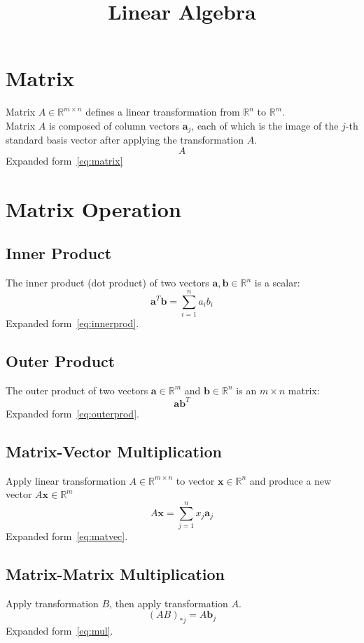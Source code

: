 \documentclass{article}
\title{Linear Algebra}
\date{}
\begin{document}
\maketitle

\tableofcontents

\newpage
\section{Matrix}
Matrix $A \in \mathbb{R}^{m \times n}$ defines a linear transformation from $\mathbb{R}^n$ to $\mathbb{R}^m$.\\
Matrix $A$ is composed of column vectors $\mathbf{a}_j$, each of which is the image of the $j$-th standard basis vector after applying the transformation $A$.
\[
    A
\]
Expanded form~\ref{eq:matrix}


\newpage
\section{Matrix Operation}


\subsection{Inner Product}
The inner product (dot product) of two vectors $\mathbf{a}, \mathbf{b} \in \mathbb{R}^n$ is a scalar:
\[
    \mathbf{a}^T \mathbf{b} = \sum_{i=1}^n a_i b_i
\]
Expanded form~\ref{eq:innerprod}.

\subsection{Outer Product}
The outer product of two vectors $\mathbf{a} \in \mathbb{R}^m$ and $\mathbf{b} \in \mathbb{R}^n$ is an $m \times n$ matrix:
\[
    \mathbf{a} \mathbf{b}^T
\]
Expanded form~\ref{eq:outerprod}.

\subsection{Matrix-Vector Multiplication}
Apply linear transformation $A \in \mathbb{R}^{m \times n}$ to vector $\mathbf{x} \in \mathbb{R}^n$ and produce a new vector $A\mathbf{x} \in \mathbb{R}^m$
\[
    A\mathbf{x} = \sum_{j=1}^n x_j \mathbf{a}_j
\]{
Expanded} form~\ref{eq:matvec}.

\subsection{Matrix-Matrix Multiplication}
Apply transformation $B$, then apply transformation $A$.
\[
    (AB)_{*j} = A\mathbf{b}_j
\]
Expanded form~\ref{eq:mul}.
\end{document}

